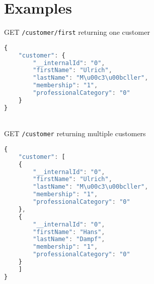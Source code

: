 \section{Examples}

GET \lstinline|/customer/first| returning one customer
\begin{lstlisting}[language=Javascript]
{
	"customer": {
		"__internalId": "0",
		"firstName": "Ulrich",
		"lastName": "M\u00c3\u00bcller",
		"membership": "1",
		"professionalCategory": "0"
	}
}
\end{lstlisting}
~
\\
GET \lstinline|/customer| returning multiple customers
\begin{lstlisting}[language=Javascript]
{
	"customer": [
	{
		"__internalId": "0",
		"firstName": "Ulrich",
		"lastName": "M\u00c3\u00bcller",
		"membership": "1",
		"professionalCategory": "0"
	},
	{
		"__internalId": "0",
		"firstName": "Hans",
		"lastName": "Dampf",
		"membership": "1",
		"professionalCategory": "0"
	}
	]
}
\end{lstlisting}
